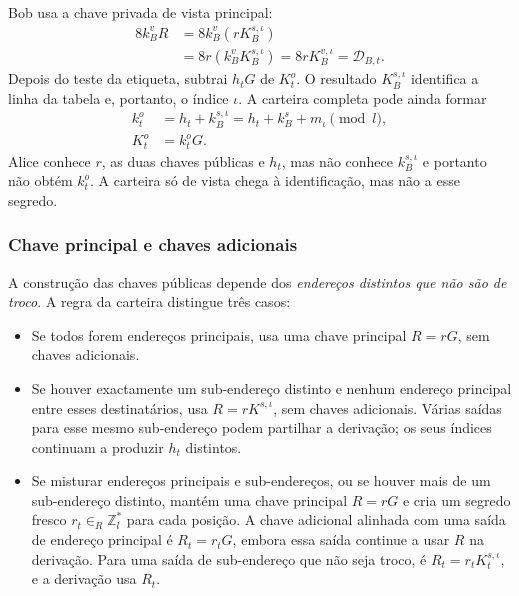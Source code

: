 Bob usa a chave privada de vista principal:
\begin{align*}
 8k_B^vR
 &=8k_B^v(rK_B^{s,\iota})\\
 &=8r(k_B^vK_B^{s,\iota})
  =8rK_B^{v,\iota}
  =\mathcal D_{B,t}.
\end{align*}
%
Depois do teste da etiqueta, subtrai \(h_tG\) de \(K_t^o\). O resultado
\(K_B^{s,\iota}\) identifica a linha da tabela e, portanto, o índice
\(\iota\). A carteira completa pode ainda formar
\begin{align*}
 k_t^o&=h_t+k_B^{s,\iota}
       =h_t+k_B^s+m_\iota\pmod l,\\
 K_t^o&=k_t^oG.
\end{align*}
Alice conhece \(r\), as duas chaves públicas e \(h_t\), mas não conhece
\(k_B^{s,\iota}\) e portanto não obtém \(k_t^o\). A carteira só de vista
chega à identificação, mas não a esse segredo.


\subsubsection*{Chave principal e chaves adicionais}

A construção das chaves públicas depende dos \emph{endereços distintos que
não são de troco}. A regra da carteira distingue três casos:

\begin{itemize}
 \item Se todos forem endereços principais, usa uma chave principal
 \(R=rG\), sem chaves adicionais.

 \item Se houver exactamente um sub-endereço distinto e nenhum endereço
 principal entre esses destinatários, usa
 \(R=rK^{s,\iota}\), sem chaves adicionais. Várias saídas para esse mesmo
 sub-endereço podem partilhar a derivação; os seus índices continuam a
 produzir \(h_t\) distintos.

 \item Se misturar endereços principais e sub-endereços, ou se houver mais
 de um sub-endereço distinto, mantém uma chave principal \(R=rG\) e cria um
 segredo fresco \(r_t\in_R\mathbb{Z}_l^*\) para cada posição. A chave adicional
 alinhada com uma saída de endereço principal é \(R_t=r_tG\), embora essa saída
 continue a usar \(R\) na derivação. Para uma saída de sub-endereço que não seja
 troco, é \(R_t=r_tK_t^{s,\iota}\), e a derivação usa \(R_t\).
\end{itemize}

